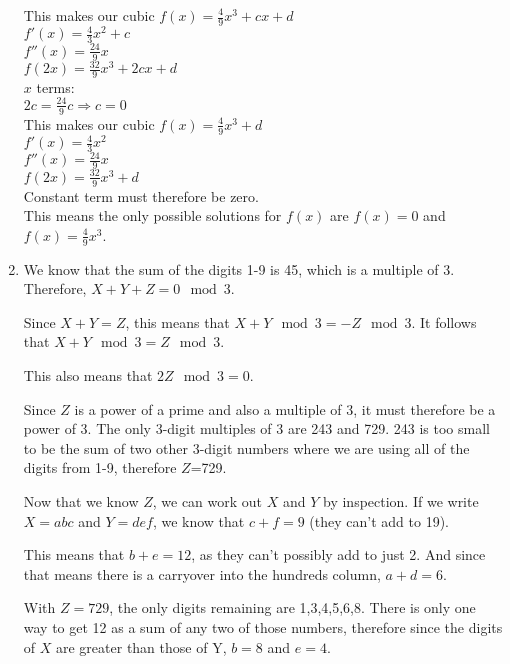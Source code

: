 \documentclass[../main.tex]{subfiles}
\begin{document}
\begin{enumerate}[itemsep=1cm]
    This makes our cubic \(f(x)=\frac{4}{9}x^3+cx+d\)\\

    \(f'(x)=\frac{4}{3}x^2+c\)\\
    \(f''(x)=\frac{24}{9}x\)\\
    \(f(2x)=\frac{32}{9}x^3+2cx+d\)\\

    \(x\) terms:\\
    \(2c=\frac{24}{9}c \Rightarrow c=0\)\\
    
    This makes our cubic \(f(x)=\frac{4}{9}x^3+d\)\\

    \(f'(x)=\frac{4}{3}x^2\)\\
    \(f''(x)=\frac{24}{9}x\)\\
    \(f(2x)=\frac{32}{9}x^3+d\)\\

    Constant term must therefore be zero.\\

    This means the only possible solutions for \(f(x)\) are \(f(x)=0\) and \(f(x)=\frac{4}{9}x^3\).\\
    
    \item 
    
    We know that the sum of the digits 1-9 is 45, which is a multiple of 3. Therefore, $X + Y + Z = 0 \mod{3}$.

    Since $X+Y=Z$, this means that $X+Y \mod{3}=-Z\mod{3}$. It follows that $X+Y \mod{3}=Z\mod{3}$.

    This also means that $2Z \mod{3}=0$.

    Since $Z$ is a power of a prime and also a multiple of 3, it must therefore be a power of 3. The only 3-digit multiples of 3 are 243 and 729. 243 is too small to be the sum of two other 3-digit numbers where we are using all of the digits from 1-9, therefore $Z$=729.

    Now that we know $Z$, we can work out $X$ and $Y$ by inspection. If we write $X=abc$ and $Y=def$, we know that $c+f=9$ (they can't add to 19).

    This means that $b+e=12$, as they can't possibly add to just 2. And since that means there is a carryover into the hundreds column, $a+d=6$.

    With $Z=729$, the only digits remaining are 1,3,4,5,6,8. There is only one way to get 12 as a sum of any two of those numbers, therefore since the digits of $X$ are greater than those of Y, $b=8$ and $e=4$. 


\end{enumerate}
\end{document}
